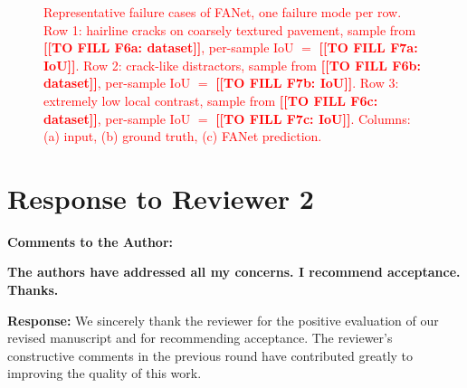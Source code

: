 \documentclass[lettersize,journal,onecolumn,12pt]{IEEEtran}
\newcommand{\FILLIN}[1]{\colorbox{fillyellow}{\textcolor{fillorange}{\textbf{[[TO FILL #1]]}}}}
\begin{document}
\begin{figure}[!hbpt]
\centering
\caption{\textcolor{red}{Representative failure cases of FANet, one failure mode per row.
Row 1: hairline cracks on coarsely textured pavement, sample from \FILLIN{F6a: dataset},
per-sample IoU $=$ \FILLIN{F7a: IoU}.
Row 2: crack-like distractors, sample from \FILLIN{F6b: dataset}, per-sample IoU $=$ \FILLIN{F7b: IoU}.
Row 3: extremely low local contrast, sample from \FILLIN{F6c: dataset}, per-sample IoU $=$ \FILLIN{F7c: IoU}.
Columns: (a) input, (b) ground truth, (c) FANet prediction.}}
\label{failure_rebuttal}
\end{figure}

\vspace{6pt}


\clearpage

\section{Response to Reviewer 2}

{\color{BlueGreen} \textbf{Comments to the Author:}

\textbf{The authors have addressed all my concerns. I recommend acceptance. Thanks.}}

\textbf{Response:}
We sincerely thank the reviewer for the positive evaluation of our revised manuscript and for recommending
acceptance. The reviewer's constructive comments in the previous round have contributed greatly to improving the
quality of this work.\\[10pt]

\clearpage

{\small


}
\end{document}
